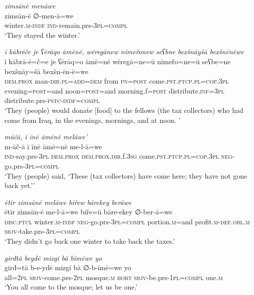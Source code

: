\ea \label{BP.37}
\textit{zimsānē menāwe} \\ 
\gll zimsān-ē ∅-men-ā=we \\ 
 winter\textsc{.m}\textsc{-indf} \textsc{ind-}remain.prs\textsc{-3pl}\textsc{=compl} \\ 
\glt `They stayed the winter.'
\z 
 
\ea \label{BP.38}
\textit{ī kābrēče je ʕērāqo āmēnē, wēregānew nīmeřonew seʕbne bexšnāyšā bexšnēnēwe} \\ 
\gll ī kābrā-ē=č=e je ʕērāq=o āmē=nē wēregā=ne=ū nīmeřo=ne=ū seʕbe=ne bexšnāy=šā bexšn-ēn-ē=we \\ 
 \textsc{dem.prox} man\textsc{-dir}\textsc{.pl}\textsc{=add}\textsc{=dem} from \textsc{pn}\textsc{=\textsc{post}} come\textsc{.pst}\textsc{.ptcp}\textsc{.pl}\textsc{=cop}\textsc{.3pl} evening\textsc{=\textsc{post}}=and noon\textsc{=\textsc{post}}=and morning.f\textsc{=\textsc{post}} distribute\textsc{.inf}\textsc{=3pl} distribute.prs\textsc{-pstc}\textsc{-indf}\textsc{=compl} \\ 
\glt `They (people) would donate [food] to the fellows (the tax collectors) who had come from Iraq, in the evenings, mornings, and at noon. '
\z 
 
\ea \label{BP.47}
\textit{māčā, ī īnē āmēnē melāwe’} \\ 
\gll m-āč-ā ī īnē āmē=nē me-l-ā=we \\ 
 \textsc{ind-}say.prs\textsc{-3pl} \textsc{dem.prox} \textsc{dem.prox}\textsc{.dir}.f\textsc{.3sg} come\textsc{.pst}\textsc{.ptcp}\textsc{.pl}\textsc{=cop}\textsc{.3pl} \textsc{neg-}go.prs\textsc{-3pl}\textsc{=compl} \\ 
\glt `They (people) said, ‘These (tax collectors) have come here; they have not gone back yet.’'
\z 
 
\ea \label{BP.48}
\textit{ētir zimsānē melāwe biřew bārekey berāwe} \\ 
\gll ētir zimsān-ē me-l-ā=we biře=ū bāre-ekey ∅-ber-ā=we \\ 
 \textsc{disc.ptcl} winter\textsc{.m}\textsc{-indf} \textsc{neg-}go.prs\textsc{-3pl}\textsc{=compl} portion\textsc{.m}=and profit\textsc{.m}\textsc{-def}\textsc{.obl}\textsc{.m} \textsc{sbjv-}take.prs\textsc{-3pl}\textsc{=compl} \\ 
\glt `They didn’t go back one winter to take back the taxes.'
\z 
 
\ea \label{BP.55}
\textit{girđtā beydē mizgī bā bīmēwe yo} \\ 
\gll girđ=tā b-e-ydē mizgī bā ∅-b-īmē=we yo \\ 
 all=\textsc{2pl} \textsc{sbjv-}come.prs-\textsc{2pl} mosque\textsc{.m} \textsc{hort} \textsc{sbjv-}be.prs-\textsc{1pl}\textsc{=compl} one\textsc{.m} \\ 
\glt `You all come to the mosque; let us be one.'
\z 
 
